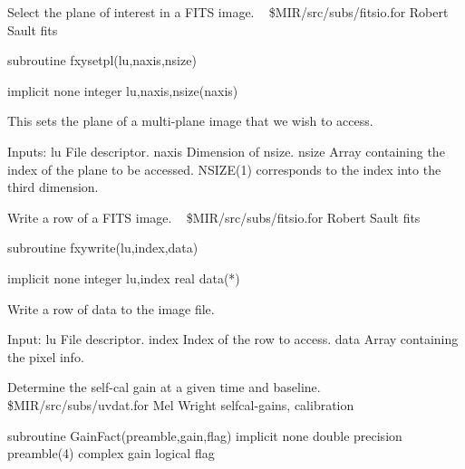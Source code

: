 %
\noindent Select the plane of interest in a FITS image.
\newline \ 
\newline {} \$MIR/src/subs/fitsio.for
\newline {} Robert Sault
\newline {} fits
\par{\tenpoint
{\eightpoint\begintt
        subroutine fxysetpl(lu,naxis,nsize)

        implicit none
        integer lu,naxis,nsize(naxis)

  This sets the plane of a multi-plane image that we wish to access.

  Inputs:
    lu         File descriptor.
    naxis      Dimension of nsize.
    nsize      Array containing the index of the plane to be accessed.
               NSIZE(1) corresponds to the index into the third dimension.
\endtt}
\par}
%
\noindent Write a row of a FITS image.
\newline \ 
\newline {} \$MIR/src/subs/fitsio.for
\newline {} Robert Sault
\newline \abox{Keywords:} fits
\par{\tenpoint
{\eightpoint\begintt
        subroutine fxywrite(lu,index,data)

        implicit none
        integer lu,index
        real data(*)

  Write a row of data to the image file.

  Input:
    lu         File descriptor.
    index      Index of the row to access.
    data       Array containing the pixel info.
\endtt}
\par}
%
\noindent Determine the self-cal gain at a given time and baseline.
\newline \ 
\newline {} \$MIR/src/subs/uvdat.for
\newline \abox{Responsible:} Mel Wright
\newline {} selfcal-gains, calibration
\par{\tenpoint
{\eightpoint\begintt
        subroutine GainFact(preamble,gain,flag)
        implicit none
        double precision preamble(4)
        complex gain
        logical flag
\endtt}
\par}
%
